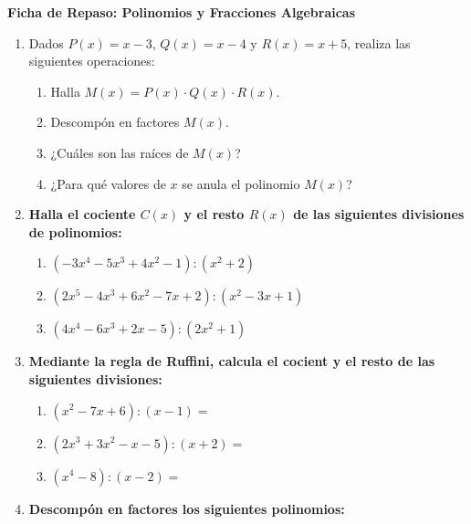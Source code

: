 \documentclass[11pt,a4paper]{article}
\begin{document}
\shorthandoff{<>}

\begin{center}
    {\LARGE \textbf{Ficha de Repaso: Polinomios y Fracciones Algebraicas}}\\[0.2cm]
\end{center}


\begin{enumerate}[label=\textbf{\arabic*.}, leftmargin=*]

    \item Dados $P(x) = x - 3$, $Q(x) = x - 4$ y $R(x) = x + 5$, realiza las siguientes operaciones:
        \begin{enumerate}[label=\textit{\alph*})]
            \item Halla $M(x) = P(x) \cdot Q(x) \cdot R(x)$.
            \item Descompón en factores $M(x)$.
            \item ¿Cuáles son las raíces de $M(x)$?
            \item ¿Para qué valores de $x$ se anula el polinomio $M(x)$?
        \end{enumerate}
    \item \textbf{Halla el cociente $C(x)$ y el resto $R(x)$ de las siguientes divisiones de polinomios:}
        \begin{enumerate}[label=\alph*), itemsep=1em]
            \item $(-3x^4 - 5x^3 + 4x^2 - 1) : (x^2 + 2)$
            \item $(2x^5 - 4x^3 + 6x^2 - 7x + 2) : (x^2 - 3x + 1)$
            \item $(4x^4 - 6x^3 + 2x - 5) : (2x^2 + 1)$
        \end{enumerate}
    \item \textbf{Mediante la regla de Ruffini, calcula el cocient y el resto de las siguientes divisiones:}
        \begin{enumerate}[label=\textit{\alph*})]
            \item $(x^2 - 7x + 6) : (x - 1) =$
            \item $(2x^3 + 3x^2 - x - 5) : (x + 2) =$
            \item $(x^4 - 8) : (x - 2) =$
        \end{enumerate}
    \item \textbf{Descompón en factores los siguientes polinomios:}
        \begin{enumerate}[label=\alph*), itemsep=0.8em]

\end{enumerate}
\end{enumerate}
\end{document}
